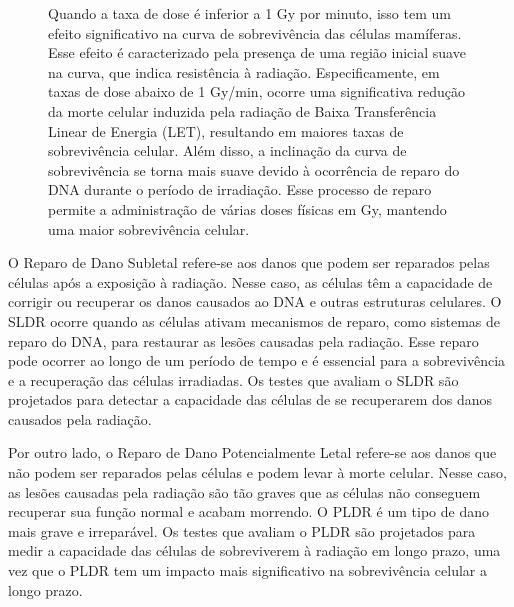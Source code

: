 \documentclass[11pt,a4paper]{article}
\begin{document}
	\begin{figure}[h]
		\centering
		\caption{Quando a taxa de dose é inferior a 1 Gy por minuto, isso tem um efeito significativo na curva de sobrevivência das células mamíferas. Esse efeito é caracterizado pela presença de uma região inicial suave na curva, que indica resistência à radiação. Especificamente, em taxas de dose abaixo de 1 Gy/min, ocorre uma significativa redução da morte celular induzida pela radiação de Baixa Transferência Linear de Energia (LET), resultando em maiores taxas de sobrevivência celular. Além disso, a inclinação da curva de sobrevivência se torna mais suave devido à ocorrência de reparo do DNA durante o período de irradiação. Esse processo de reparo permite a administração de várias doses físicas em Gy, mantendo uma maior sobrevivência celular.}
		\label{fig:reparoDanosPontenciais}
	\end{figure}

	O Reparo de Dano Subletal refere-se aos danos que podem ser reparados pelas células após a exposição à radiação. Nesse caso, as células têm a capacidade de corrigir ou recuperar os danos causados ao DNA e outras estruturas celulares. O SLDR ocorre quando as células ativam mecanismos de reparo, como sistemas de reparo do DNA, para restaurar as lesões causadas pela radiação. Esse reparo pode ocorrer ao longo de um período de tempo e é essencial para a sobrevivência e a recuperação das células irradiadas. Os testes que avaliam o SLDR são projetados para detectar a capacidade das células de se recuperarem dos danos causados pela radiação.

	Por outro lado, o Reparo de Dano Potencialmente Letal refere-se aos danos que não podem ser reparados pelas células e podem levar à morte celular. Nesse caso, as lesões causadas pela radiação são tão graves que as células não conseguem recuperar sua função normal e acabam morrendo. O PLDR é um tipo de dano mais grave e irreparável. Os testes que avaliam o PLDR são projetados para medir a capacidade das células de sobreviverem à radiação em longo prazo, uma vez que o PLDR tem um impacto mais significativo na sobrevivência celular a longo prazo.
\end{document}

